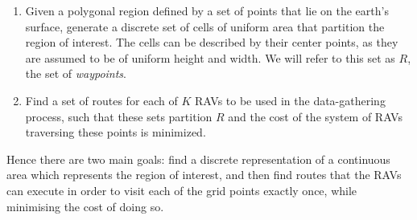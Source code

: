 \begin{enumerate}
    \item Given a polygonal region defined by a set of points that lie on the earth's surface, generate a discrete set of cells of uniform area that partition the region of interest.
    The cells can be described by their center points, as they are assumed to be of uniform height and width. We will refer to this set as $R$, the set of \textit{waypoints}.
    \item Find a set of routes for each of $K$ RAVs to be used in the data-gathering process, such that these sets partition $R$ and the cost of the system of RAVs traversing these points is minimized. %
\end{enumerate}

Hence there are two main goals: find a discrete representation of a continuous area which represents the region of interest, and then find routes that the RAVs can execute in order to visit each of the grid points exactly once, while minimising the cost of doing so. 










